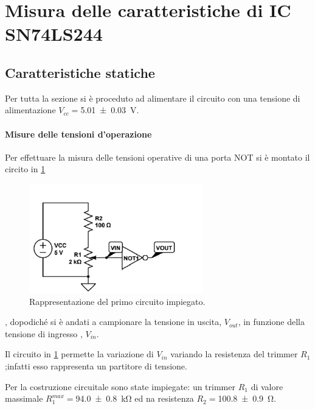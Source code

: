 \section{Misura delle caratteristiche di IC SN74LS244 }
\subsection{Caratteristiche statiche}
	Per tutta la sezione si è proceduto ad alimentare il circuito con una tensione di alimentazione $V_{cc} =$\SI{5.01 \pm 0.03}{\volt}.
	\paragraph{Misure delle tensioni d'operazione}
	Per effettuare la misura delle tensioni operative di una porta NOT si 
	è montato il circito in \figurename{ \ref{f:c1}}
		\begin{figure}[h]
			\includegraphics[scale=1.0]{../Figs-Tabs/immagine1.png}
			\caption{Rappresentazione del primo circuito impiegato.}
			\label{f:c1}
		\end{figure} ,
	dopodiché si è andati a  campionare la tensione in uscita, $V_{out}$, in funzione della tensione di ingresso , $V_{in}$.
	
	Il circuito in  \figurename{ \ref{f:c1}} permette la variazione di  $V_{in}$ variando la resistenza del trimmer $R_{1}$;infatti esso  rappresenta un partitore di tensione.
	
		Per la costruzione circuitale sono state impiegate: un trimmer $R_{1}$ di valore massimale $R_{1}^{max}=$\SI{94.0 \pm 0.8 }{\kilo \ohm} ed na resistenza $R_{2}=$\SI{100.8 \pm 0.9 }{ \ohm}.
		
